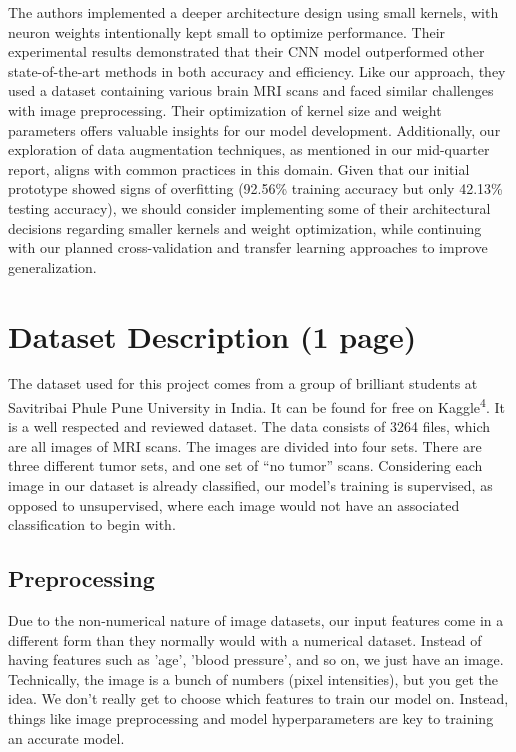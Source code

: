 \documentclass[conference]{IEEEtran}
\begin{document}
The authors implemented a deeper architecture design using small kernels, with neuron weights intentionally kept small to optimize performance. Their experimental results demonstrated that their CNN model outperformed other state-of-the-art methods in both accuracy and efficiency. Like our approach, they used a dataset containing various brain MRI scans and faced similar challenges with image preprocessing. Their optimization of kernel size and weight parameters offers valuable insights for our model development. Additionally, our exploration of data augmentation techniques, as mentioned in our mid-quarter report, aligns with common practices in this domain. Given that our initial prototype showed signs of overfitting (92.56\% training accuracy but only 42.13\% testing accuracy), we should consider implementing some of their architectural decisions regarding smaller kernels and weight optimization, while continuing with our planned cross-validation and transfer learning approaches to improve generalization.


\section{\large Dataset Description (1 page)}

The dataset used for this project comes from a group of brilliant students at Savitribai Phule Pune University in India. It can be found for free on Kaggle\textsuperscript{4}. It is a well respected and reviewed dataset. The data consists of 3264 files, which are all images of MRI scans. The images are divided into four sets. There are three different tumor sets, and one set of “no tumor” scans. Considering each image in our dataset is already classified, our model's training is supervised, as opposed to unsupervised, where each image would not have an associated classification to begin with.

\subsection{\large Preprocessing}

Due to the non-numerical nature of image datasets, our input features come in a different form than they normally would with a numerical dataset. Instead of having features such as 'age', 'blood pressure', and so on, we just have an image. Technically, the image is a bunch of numbers (pixel intensities), but you get the idea. We don't really get to choose which features to train our model on. Instead, things like image preprocessing and model hyperparameters are key to training an accurate model.
\end{document}
